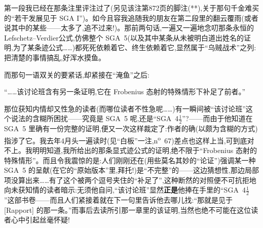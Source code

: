 第一段我已经在那条注里评注过了(另见该注第872页的脚注(**),关于那句千金难买的“若干发展见于 SGA I”)。如今且容我追随我的朋友在第二段里的翻云覆雨(或者说其中的某些——太多了,追不过来!)。那\dmark{}前两句话,一遍又一遍地念叨那条永恒的Lefschetz--Verdier公式,仿佛整个 SGA~5(以及其中某条从未被明白道出姓名的证明,为了某条迹公式……)都死死依赖着它、终生依赖着它,显然属于“乌贼战术”之列:把清楚的事情搞乱,好浑水摸鱼。

而那句一语双关的要紧话,却紧接在“淹鱼”之后:

“……该讨论班含有另一条证明,它在 Frobenius 态射的特殊情形下补足了前者。”

那位获知内情却又性急的读者(而哪位读者不性急呢……)有一瞬间被“该讨论班”这个说法的含糊所困扰——究竟是 SGA~5 呢,还是“SGA~4$\frac{1}{2}$”?——而由于他知道在 SGA~5 里确有一份完整的证明,便又一次这样裁定了:作者的确(以颇为含糊的方式)指涉了它。我去年4月头一遍读时(见“白板”一注,n\textsuperscript{o}~67)差点也这样上当,可到底对不上。我明明知道,我所给出的那条显式迹公式的证明,绝不限于“Frobenius 态射的特殊情形”。而且令我震惊的是:人们刚刚还在(用些莫名其妙的“论证”)强调某一种 SGA~5 的呈献(在它的“原始版本”里,拜托!)是“不完整”的——这边猜想性,那边局部项没算出来……有了这个被两个逗号夹住的“补足了”,这种断然的对照便不可抗拒地向未获知情的读者暗示:无须他自问,“该讨论班”显然\textbf{正是}\dmark{}他捧在手里的“SGA~4$\frac{1}{2}$”这部书卷——而且人们紧接着就在下一句里告诉他去哪儿找:“那就是见于 [Rapport] 的那一条。”而事后去读所引那一章里的该证明,当然也绝不可能在这位读者心中引起丝毫怀疑!

